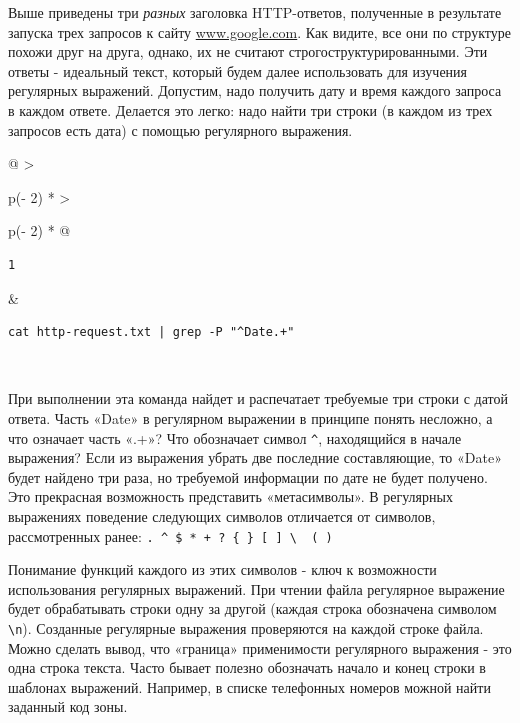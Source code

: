 \documentclass{article}
\begin{document}
Выше приведены три \emph{разных} заголовка HTTP-ответов, полученные в
результате запуска трех запросов к сайту
\href{http://www.google.com}{www.google.com}. Как видите, все они по
структуре похожи друг на друга, однако, их не считают
строгоструктурированными. Эти ответы - идеальный текст, который будем
далее использовать для изучения регулярных выражений. Допустим, надо
получить дату и время каждого запроса в каждом ответе. Делается это
легко: надо найти три строки (в каждом из трех запросов есть дата) с
помощью регулярного выражения.

\begin{longtable}[]{@{}
  >{\raggedright\arraybackslash}p{(\columnwidth - 2\tabcolsep) * }
  >{\raggedright\arraybackslash}p{(\columnwidth - 2\tabcolsep) * }@{}}
\toprule
\endhead
\begin{minipage}[t]{\linewidth}\raggedright
\begin{verbatim}
1
\end{verbatim}
\end{minipage} & \begin{minipage}[t]{\linewidth}\raggedright
\begin{verbatim}
cat http-request.txt | grep -P "^Date.+"
\end{verbatim}
\end{minipage} \\ \addlinespace
\bottomrule
\end{longtable}

При выполнении эта команда найдет и распечатает требуемые три строки с
датой ответа. Часть «Date» в регулярном выражении в принципе понять
несложно, а что означает часть «.+»? Что обозначает символ
\texttt{\^{}}, находящийся в начале выражения? Если из выражения убрать
две последние составляющие, то «Date» будет найдено три раза, но
требуемой информации по дате не будет получено. Это прекрасная
возможность представить «метасимволы». В регулярных выражениях поведение
следующих символов отличается от символов, рассмотренных ранее:
\texttt{.\ \^{}\ \$\ *\ +\ ?\ \{\ \}\ {[}\ {]}\ \textbackslash{}\ \textbar{}\ (\ )}

Понимание функций каждого из этих символов - ключ к возможности
использования регулярных выражений. При чтении файла регулярное
выражение будет обрабатывать строки одну за другой (каждая строка
обозначена символом \texttt{\textbackslash{}n}). Созданные регулярные
выражения проверяются на каждой строке файла. Можно сделать вывод, что
«граница» применимости регулярного выражения - это одна строка текста.
Часто бывает полезно обозначать начало и конец строки в шаблонах
выражений. Например, в списке телефонных номеров можной найти заданный
код зоны.
\end{document}
